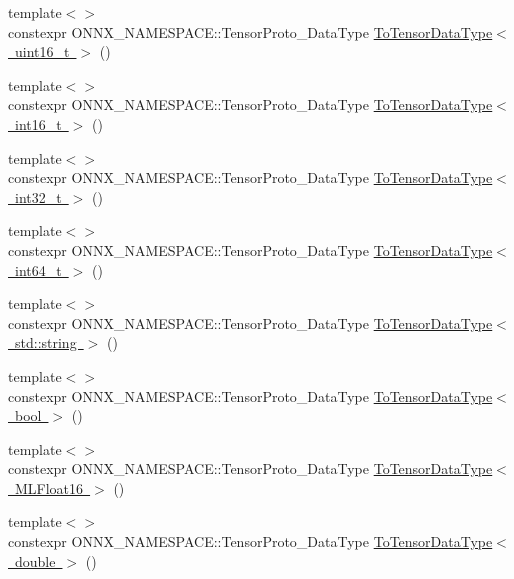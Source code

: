 \begin{DoxyCompactItemize}
\item 
{\footnotesize template$<$$>$ }\\constexpr O\+N\+N\+X\+\_\+\+N\+A\+M\+E\+S\+P\+A\+C\+E\+::\+Tensor\+Proto\+\_\+\+Data\+Type \mbox{\hyperlink{namespaceonnxruntime_1_1data__types__internal_a26712c0e041f0b0892ecec74a7de0db3}{To\+Tensor\+Data\+Type$<$ uint16\+\_\+t $>$}} ()
\item 
{\footnotesize template$<$$>$ }\\constexpr O\+N\+N\+X\+\_\+\+N\+A\+M\+E\+S\+P\+A\+C\+E\+::\+Tensor\+Proto\+\_\+\+Data\+Type \mbox{\hyperlink{namespaceonnxruntime_1_1data__types__internal_afa1e21a8cc57f4e3e734cff37c19d61a}{To\+Tensor\+Data\+Type$<$ int16\+\_\+t $>$}} ()
\item 
{\footnotesize template$<$$>$ }\\constexpr O\+N\+N\+X\+\_\+\+N\+A\+M\+E\+S\+P\+A\+C\+E\+::\+Tensor\+Proto\+\_\+\+Data\+Type \mbox{\hyperlink{namespaceonnxruntime_1_1data__types__internal_aec3d8f70c6c6e40b2c0f7c0d33e81524}{To\+Tensor\+Data\+Type$<$ int32\+\_\+t $>$}} ()
\item 
{\footnotesize template$<$$>$ }\\constexpr O\+N\+N\+X\+\_\+\+N\+A\+M\+E\+S\+P\+A\+C\+E\+::\+Tensor\+Proto\+\_\+\+Data\+Type \mbox{\hyperlink{namespaceonnxruntime_1_1data__types__internal_a36dcfc6dc3ba7f1c6e6e21b1b00baea7}{To\+Tensor\+Data\+Type$<$ int64\+\_\+t $>$}} ()
\item 
{\footnotesize template$<$$>$ }\\constexpr O\+N\+N\+X\+\_\+\+N\+A\+M\+E\+S\+P\+A\+C\+E\+::\+Tensor\+Proto\+\_\+\+Data\+Type \mbox{\hyperlink{namespaceonnxruntime_1_1data__types__internal_a3cc313d3f9c612ca3d515935a27b9f83}{To\+Tensor\+Data\+Type$<$ std\+::string $>$}} ()
\item 
{\footnotesize template$<$$>$ }\\constexpr O\+N\+N\+X\+\_\+\+N\+A\+M\+E\+S\+P\+A\+C\+E\+::\+Tensor\+Proto\+\_\+\+Data\+Type \mbox{\hyperlink{namespaceonnxruntime_1_1data__types__internal_a4b27a13ddb99a1f038164fa4e00f8d6d}{To\+Tensor\+Data\+Type$<$ bool $>$}} ()
\item 
{\footnotesize template$<$$>$ }\\constexpr O\+N\+N\+X\+\_\+\+N\+A\+M\+E\+S\+P\+A\+C\+E\+::\+Tensor\+Proto\+\_\+\+Data\+Type \mbox{\hyperlink{namespaceonnxruntime_1_1data__types__internal_a5814ef0fefa2bc39482b6f0e353870c8}{To\+Tensor\+Data\+Type$<$ M\+L\+Float16 $>$}} ()
\item 
{\footnotesize template$<$$>$ }\\constexpr O\+N\+N\+X\+\_\+\+N\+A\+M\+E\+S\+P\+A\+C\+E\+::\+Tensor\+Proto\+\_\+\+Data\+Type \mbox{\hyperlink{namespaceonnxruntime_1_1data__types__internal_af8323c3b39bbca11365fe0a22eaa887a}{To\+Tensor\+Data\+Type$<$ double $>$}} ()

\end{DoxyCompactItemize}
